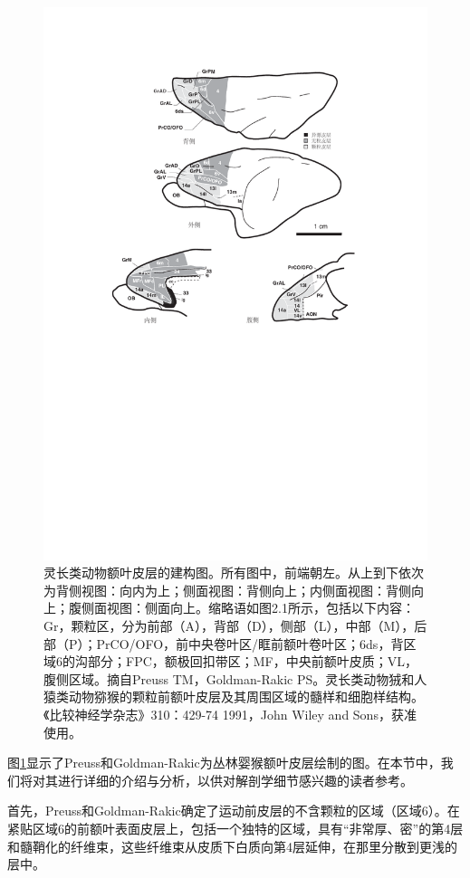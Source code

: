 \begin{figure}[!htb]
	\centering
	\includegraphics[width=0.8\linewidth]{image_pfc/Fig_2_3}
	\caption{灵长类动物额叶皮层的建构图。所有图中，前端朝左。从上到下依次为背侧视图：向内为上；侧面视图：背侧向上；内侧面视图：背侧向上；腹侧面视图：侧面向上。缩略语如图2.1所示，包括以下内容：Gr，颗粒区，分为前部（A），背部（D），侧部（L），中部（M），后部（P）；PrCO/OFO，前中央卷叶区/眶前额叶卷叶区；6ds，背区域6的沟部分；FPC，额极回扣带区；MF，中央前额叶皮质；VL，腹侧区域。摘自Preuss TM，Goldman-Rakic PS。灵长类动物狨和人猿类动物猕猴的颗粒前额叶皮层及其周围区域的髓样和细胞样结构。《比较神经学杂志》310：429-74  1991，John Wiley and Sons，获准使用。\label{fig:fig_2_3}}
\end{figure}

图\ref{fig:fig_2_3}显示了Preuss和Goldman-Rakic为丛林婴猴额叶皮层绘制的图。在本节中，我们将对其进行详细的介绍与分析，以供对解剖学细节感兴趣的读者参考。

首先，Preuss和Goldman-Rakic确定了运动前皮层的不含颗粒的区域（区域6）。在紧贴区域6的前额叶表面皮层上，包括一个独特的区域，具有“非常厚、密”的第4层和髓鞘化的纤维束，这些纤维束从皮质下白质向第4层延伸，在那里分散到更浅的层中。

